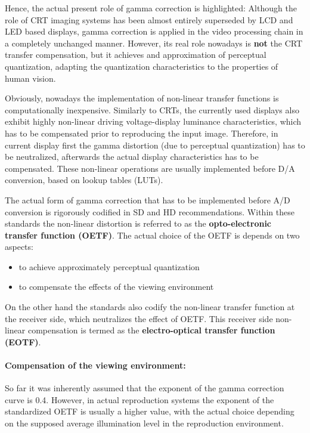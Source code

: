 Hence, the actual present role of gamma correction is highlighted:
Although the role of CRT imaging systems has been almost entirely superseded by LCD and LED based displays, gamma correction is applied in the video processing chain in a completely unchanged manner.
However, its real role nowadays is \textbf{not} the CRT transfer compensation, but it achieves and approximation of perceptual quantization, adapting the quantization characteristics to the properties of human vision.


\vspace{3mm}
Obviously, nowadays the implementation of non-linear transfer functions is computationally inexpensive.
Similarly to CRTs, the currently used displays also exhibit highly non-linear driving voltage-display luminance characteristics, which has to be compensated prior to reproducing the input image.
Therefore, in current display first the gamma distortion (due to perceptual quantization) has to be neutralized, afterwards the actual display characteristics has to be compensated.
These non-linear operations are usually implemented before D/A conversion, based on lookup tables (LUTs).

\vspace{3mm}
The actual form of gamma correction that has to be implemented before A/D conversion is rigorously codified in SD and HD recommendations.
Within these standards the non-linear distortion is referred to as the \textbf{opto-electronic transfer function (OETF)}.
The actual choice of the OETF is depends on two aspects:
\begin{itemize}
\item to achieve approximately perceptual quantization
\item to compensate the effects of the viewing environment
\end{itemize}
On the other hand the standards also codify the non-linear transfer function at the receiver side, which neutralizes the effect of OETF.
This receiver side non-linear compensation is termed as the \textbf{electro-optical transfer function (EOTF)}.

\paragraph{Compensation of the viewing environment:\\}
So far it was inherently assumed that the exponent of the gamma correction curve is 0.4.
However, in actual reproduction systems the exponent of the standardized OETF is usually a higher value, with the actual choice depending on the supposed average illumination level in the reproduction environment.

